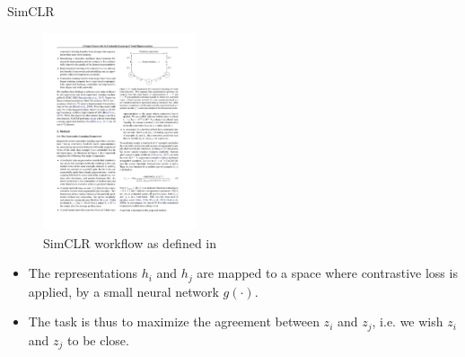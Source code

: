 \documentclass[xcolor=pdftex,dvipsnames,table]{beamer}
\begin{document}
\begin{frame}{SimCLR \cite{Chen2020}}
\begin{figure}[htb]
   \centering
   \includegraphics[width=0.4\textwidth]{../graphics/sim_clr.pdf}
   \caption{SimCLR workflow as defined in \cite{Chen2020}}
\end{figure}
\begin{itemize}
\item The representations $h_i$ and $h_j$ are mapped to a space where contrastive loss is applied, by a small neural network $g(\cdot)$. 
\item The task is thus to maximize the agreement between $z_i$ and $z_j$, i.e. we wish $z_i$ and $z_j$ to be close. 
\end{itemize}
\end{frame}
\end{document}
